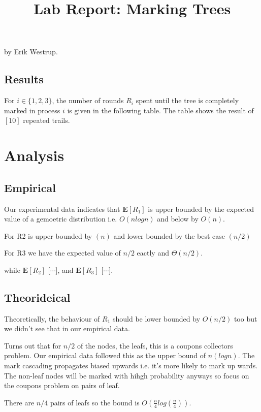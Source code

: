 \documentclass{tufte-handout}
\title{\sf Lab Report: Marking Trees}
\date{}
\begin{document}
\maketitle

by Erik Westrup. 

\subsection{Results}

For $i\in\{1,2,3\}$, the number of rounds $R_i$ spent until the tree
is completely marked in process $i$ is given in the following table.
The table shows the result of $[10]$ repeated
trails.



\section{Analysis}

\subsection{Empirical}
Our experimental data indicates that $\mathbf E [R_1]$ is upper bounded by the expected value of a gemoetric distribution i.e. $O(nlogn)$ and below by $O(n)$.

For R2 is upper bounded by $(n)$ and lower bounded by the best case $(n/2)$

For R3 we have the expected value of $n/2$ eactly and $\Theta(n/2)$.

while $\mathbf E[R_2]$ [$\cdots$], and $\mathbf E[R_3]$
[$\cdots$].

\subsection{Theorideical}
Theoretically, the behaviour of $R_1$ should be lower bounded by $O(n/2)$ too but we didn't see that in our empirical data.

Turns out that for $n/2$ of the nodes, the leafs, this is a coupons collectors problem. Our empirical data followed this as the upper bound of $n(logn)$. The mark cascading propagates biased upwards i.e. it's more likely to mark up wards. The non-leaf nodes will be marked with hihgh probability anyways so focus on the coupons problem on pairs of leaf.

There are $n/4$ pairs of leafs so the bound is $O(\frac{n}{4}log(\frac{n}{4}))$.
\end{document}

